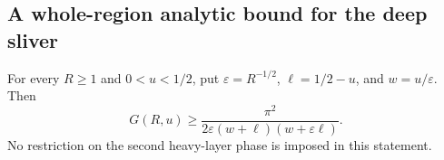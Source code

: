 
\subsection{A whole-region analytic bound for the deep sliver}

\begin{lemma}\label{lem:r8-phase-speed}
For every $R\ge1$ and $0<u<1/2$, put
$\varepsilon=R^{-1/2}$, $\ell=1/2-u$, and $w=u/\varepsilon$.
Then
\begin{equation}
 G(R,u)\ge
 \frac{\pi^2}{2\varepsilon(w+\ell)(w+\varepsilon\ell)}.
 \label{eq:r8-global-gap-bound}
\end{equation}
No restriction on the second heavy-layer phase is imposed in this statement.
\end{lemma}


